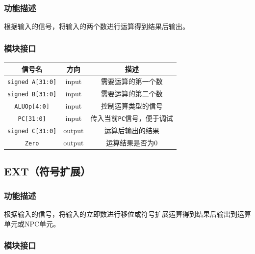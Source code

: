\documentclass[UTF8,a4paper,autofakebold,15pt]{ctexart}
\begin{document}
\subsubsection{功能描述}

根据输入的信号，将输入的两个数进行运算得到结果后输出。

\subsubsection{模块接口}

\begin{center}
	
	
	\begin{tabular}{|c|c|c|}
		\hline
		信号名&方向&描述\\
		\hline
		{\tt {\color{gray}signed} A[31:0]}&input&需要运算的第一个数\\
		\hline
		{\tt {\color{gray}signed} B[31:0]}&input&需要运算的第二个数\\
		\hline
		{\tt ALUOp[4:0]}&input&控制运算类型的信号\\
		\hline
		{\tt PC[31:0]}&input&传入当前{\tt PC}信号，便于调试\\
		\hline
		{\tt {\color{gray}signed} C[31:0]}&output&运算后输出的结果\\
		\hline
		{\tt Zero}&output&运算结果是否为0\\
		\hline
	\end{tabular}

\end{center}

\subsection{EXT（符号扩展）}

\subsubsection{功能描述}

根据输入的信号，将输入的立即数进行移位或符号扩展运算得到结果后输出到运算单元或NPC单元。

\subsubsection{模块接口}
\end{document}
